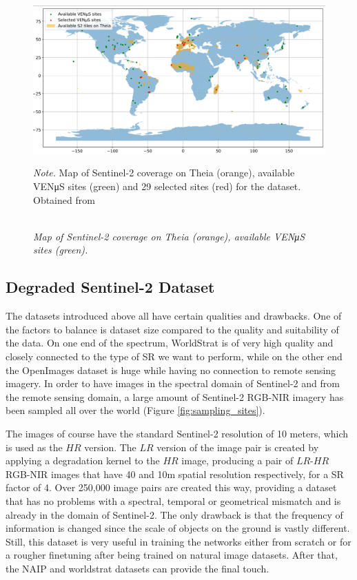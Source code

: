 \begin{figure}[H] 
    \caption{\doublespacing \\ \textit{Map of Sentinel-2 coverage on Theia (orange), available VENμS sites (green).}} 
    \centering
    \includegraphics[width=1\linewidth]{images/csaybar_fig06.png}
    \begin{justify}
        \textit{Note.} Map of Sentinel-2 coverage on Theia (orange), available VENμS sites (green) and 29 selected sites (red) for the dataset. Obtained from \textcite{michel2022sen2venmus}
    \end{justify}                    
    \label{fig:sen2venus}
\end{figure}


\subsection{Degraded Sentinel-2 Dataset}

The datasets introduced above all have certain qualities and drawbacks. One of the factors to balance is dataset size compared to the quality and suitability of the data. On one end of the spectrum, WorldStrat is of very high quality and closely connected to the type of SR we want to perform, while on the other end the OpenImages dataset is huge while having no connection to remote sensing imagery. In order to have images in the spectral domain of Sentinel-2 and from the remote sensing domain, a large amount of Sentinel-2 RGB-NIR imagery has been sampled all over the world (Figure \ref{fig:sampling_sites}).

The images of course have the standard Sentinel-2 resolution of 10 meters, which is used as the $HR$ version. The $LR$ version of the image pair is created by applying a degradation kernel to the $HR$ image, producing a pair of $LR$-$HR$ RGB-NIR images that have 40 and 10m spatial resolution respectively, for a SR factor of 4. Over 250,000 image pairs are created this way, providing a dataset that has no problems with a spectral, temporal or geometrical mismatch and is already in the domain of Sentinel-2. The only drawback is that the frequency of information is changed since the scale of objects on the ground is vastly different. Still, this dataset is very useful in training the networks either from scratch or for a rougher finetuning after being trained on natural image datasets. After that, the NAIP and worldstrat datasets can provide the final touch.

